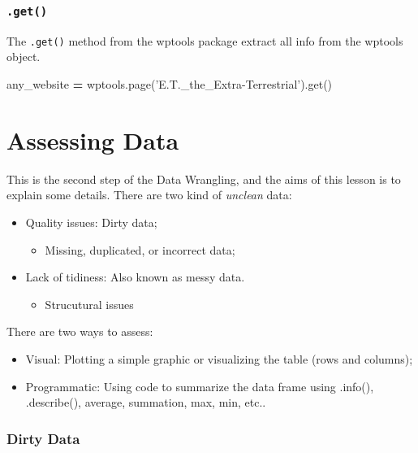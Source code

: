 \documentclass[]{book}
\newenvironment{Shaded}{\begin{snugshade}}{\end{snugshade}}
\newcommand{\StringTok}[1]{\textcolor[rgb]{0.31,0.60,0.02}{#1}}
\newcommand{\OperatorTok}[1]{\textcolor[rgb]{0.81,0.36,0.00}{\textbf{#1}}}
\newcommand{\NormalTok}[1]{#1}
\providecommand{\tightlist}{%
  \setlength{\itemsep}{0pt}\setlength{\parskip}{0pt}}
\begin{document}
\subsubsection{\texorpdfstring{\texttt{.get()}}{.get()}}\label{get}

The \texttt{.get()} method from the wptools package extract all info
from the wptools object.

\begin{Shaded}
\begin{Highlighting}[]
\NormalTok{any_website }\OperatorTok{=}\NormalTok{ wptools.page(}\StringTok{'E.T._the_Extra-Terrestrial'}\NormalTok{).get()}
\end{Highlighting}
\end{Shaded}

\section{Assessing Data}\label{assessing-data}

This is the second step of the Data Wrangling, and the aims of this
lesson is to explain some details. There are two kind of \emph{unclean}
data:

\begin{itemize}
\tightlist
\item
  Quality issues: Dirty data;

  \begin{itemize}
  \tightlist
  \item
    Missing, duplicated, or incorrect data;
  \end{itemize}
\item
  Lack of tidiness: Also known as messy data.

  \begin{itemize}
  \tightlist
  \item
    Strucutural issues
  \end{itemize}
\end{itemize}

There are two ways to assess:

\begin{itemize}
\tightlist
\item
  Visual: Plotting a simple graphic or visualizing the table (rows and
  columns);
\item
  Programmatic: Using code to summarize the data frame using .info(),
  .describe(), average, summation, max, min, etc..
\end{itemize}

\subsubsection{Dirty Data}\label{dirty-data}
\end{document}
